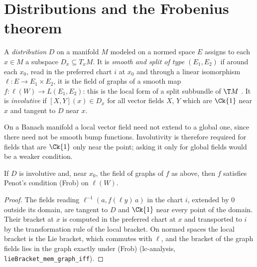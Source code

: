 \section{Distributions and the Frobenius theorem}

\begin{definition}[Distributions]
  \label{def:man-distribution}
  \leanok
  A \emph{distribution} $D$ on a manifold $M$ modeled on a normed space $E$ assigns to each
  $x \in M$ a subspace $D_x \subseteq T_x M$. It is \emph{smooth and split of type $(E_1, E_2)$}
  if around each $x_0$, read in the preferred chart $i$ at $x_0$ and through a linear isomorphism
  $\ell \colon E \to E_1 \times E_2$, it is the field of graphs of a smooth map
  $f \colon \ell(W) \to L(E_1, E_2)$: this is the local form of a split subbundle of $\T M$
  \cite[Ch.~VI, \S1, pp.~155--157]{Lan99}. It is \emph{involutive} if $[X, Y](x) \in D_x$ for all
  vector fields $X$, $Y$ which are $\Ck{1}$ near $x$ and tangent to $D$ near $x$.
\end{definition}

\begin{remark}
  On a Banach manifold a local vector field need not extend to a global one, since there need not
  be smooth bump functions. Involutivity is therefore required for fields that are $\Ck{1}$ only
  near the point; asking it only for global fields would be a weaker condition.
\end{remark}

\begin{lemma}
  \label{lem:man-involutive-frob}
  \leanok
  If $D$ is involutive and, near $x_0$, the field of graphs of $f$ as above, then $f$ satisfies
  Penot's condition (Frob) on $\ell(W)$.
\end{lemma}

\begin{proof}
  \leanok
  The fields reading $\ell^{-1}(a, f(\ell y)\,a)$ in the chart $i$, extended by $0$ outside its
  domain, are tangent to $D$ and $\Ck{1}$ near every point of the domain. Their bracket at $x$ is
  computed in the preferred chart at $x$ and transported to $i$ by the transformation rule of the
  local bracket. On normed spaces the local bracket is the Lie bracket, which commutes with
  $\ell$, and the bracket of the graph fields lies in the graph exactly under (Frob)
  (lc-analysis, \texttt{lieBracket\_mem\_graph\_iff}).
\end{proof}

